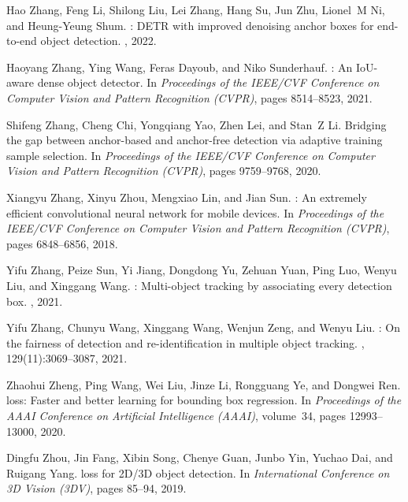\documentclass[10pt,twocolumn,letterpaper]{article}
\begin{document}
{\begin{thebibliography}{100}
				Hao Zhang, Feng Li, Shilong Liu, Lei Zhang, Hang Su, Jun Zhu, Lionel~M Ni, and
				Heung-Yeung Shum.
				: {DETR} with improved denoising anchor boxes for end-to-end
				object detection.
				, 2022.
				
				Haoyang Zhang, Ying Wang, Feras Dayoub, and Niko Sunderhauf.
				: An {IoU}-aware dense object detector.
				\newblock In {\em Proceedings of the IEEE/CVF Conference on Computer Vision and
					Pattern Recognition (CVPR)}, pages 8514--8523, 2021.
				
				Shifeng Zhang, Cheng Chi, Yongqiang Yao, Zhen Lei, and Stan~Z Li.
				\newblock Bridging the gap between anchor-based and anchor-free detection via
				adaptive training sample selection.
				\newblock In {\em Proceedings of the IEEE/CVF Conference on Computer Vision and
					Pattern Recognition (CVPR)}, pages 9759--9768, 2020.
				
				Xiangyu Zhang, Xinyu Zhou, Mengxiao Lin, and Jian Sun.
				: An extremely efficient convolutional neural network for
				mobile devices.
				\newblock In {\em Proceedings of the IEEE/CVF Conference on Computer Vision and
					Pattern Recognition (CVPR)}, pages 6848--6856, 2018.
				
				Yifu Zhang, Peize Sun, Yi Jiang, Dongdong Yu, Zehuan Yuan, Ping Luo, Wenyu Liu,
				and Xinggang Wang.
				: Multi-object tracking by associating every detection
				box.
				, 2021.
				
				Yifu Zhang, Chunyu Wang, Xinggang Wang, Wenjun Zeng, and Wenyu Liu.
				: On the fairness of detection and re-identification in
				multiple object tracking.
				, 129(11):3069--3087,
				2021.
				
				Zhaohui Zheng, Ping Wang, Wei Liu, Jinze Li, Rongguang Ye, and Dongwei Ren.
				 loss: Faster and better learning for bounding box
				regression.
				\newblock In {\em Proceedings of the AAAI Conference on Artificial Intelligence
					(AAAI)}, volume~34, pages 12993--13000, 2020.
				
				Dingfu Zhou, Jin Fang, Xibin Song, Chenye Guan, Junbo Yin, Yuchao Dai, and
				Ruigang Yang.
				 loss for {2D}/{3D} object detection.
				\newblock In {\em International Conference on 3D Vision (3DV)}, pages 85--94,
				2019.
				

\end{thebibliography}}
\end{document}
